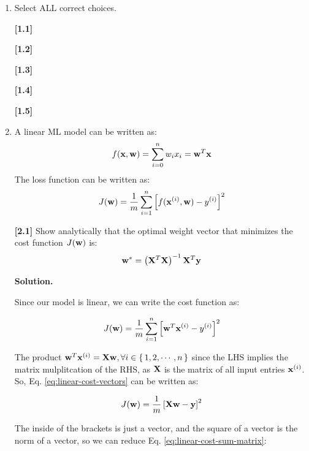 \documentclass[11pt]{article}
\begin{document}

\begin{enumerate}[start=1,label={\bfseries Question \arabic*:},leftmargin=1in] %

    \item Select ALL correct choices.
    
    \textbf{[1.1]}

    \textbf{[1.2]}
    
    \textbf{[1.3]}
    
    \textbf{[1.4]}
    
    \textbf{[1.5]}

    \item A linear ML model can be written as: \[f(\vb{x}, \vb{w}) = \sum_{i=0}^n w_i x_i = \vb{w}^T \vb{x}\] The loss function can be written as: \[ J(\vb{w}) = \frac{1}{m} \sum_{i=1}^n \left[ f(\vb{x}^{(i)}, \vb{w}) - y^{(i)} \right]^2 \]

        \textbf{[2.1]} Show analytically that the optimal weight vector that minimizes the cost function \(J(\vb{w})\) is: \[\vb{w}^* = \left( \vb{X}^T\vb{X}  \right)^{-1} \vb{X}^T\vb{y} \]

        \noindent \textbf{Solution.}

        \noindent Since our model is linear, we can write the cost function as:

        \begin{equation}
            J(\vb{w}) = \frac{1}{m} \sum_{i=1}^n \left[ \vb{w}^T \vb{x}^{(i)} - y^{(i)} \right]^2
            \label{eq:linear-cost-vectors}
        \end{equation}

        The product \(\vb{w}^T \vb{x}^{(i)} = \vb{Xw}, \forall i \in \set{1, 2, \cdots, n}\) since the LHS implies the matrix mulplitcation of the RHS, as \(\vb{X}\) is the matrix of all input entries \(\vb{x}^{(i)}\). So, Eq. \ref{eq:linear-cost-vectors} can be written as:

        \begin{equation}
            J(\vb{w}) = \frac{1}{m} \left[ \vb{Xw}  - \vb{y} \right]^2
            \label{eq:linear-cost-sum-matrix}
        \end{equation}

        The inside of the brackets is just a vector, and the square of a vector is the norm of a vector, so we can reduce Eq. \ref{eq:linear-cost-sum-matrix}:


\end{enumerate}
\end{document}
